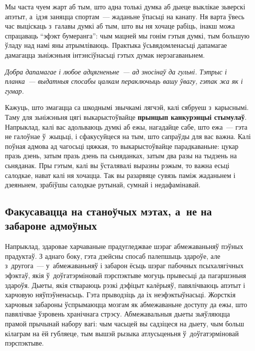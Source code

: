 
Мы часта чуем жарт аб тым, што адна толькі думка аб дыеце выклікае зьверскі апэтыт, а~ідэя заняцца спортам~--- жаданьне ўпасьці на канапу. Ня варта ўвесь час выціскаць з~галавы думкі аб тым, што вы ня хочаце рабіць, інакш можа спрацаваць ``эфэкт бумеранга'': чым мацней мы гонім гэтыя думкі, тым большую ўладу над намі яны атрымліваюць. Практыка ўсьвядомленасьці дапамагае дамагацца зьніжэньня інтэнсіўнасьці гэтых думак нерэагаваньнем.

\emph{Добра дапамагае і любое адцягненьне~--- ад зносінаў да гульні. Тэтрыс і планка~--- выдатныя спосабы цалкам пераключыць вашу ўвагу, гэтак жа як і гумар.}

Кажуць, што змагацца са шкоднымі звычкамі лягчэй, калі сябруеш з~карыснымі. Таму для зьніжэньня цягі выкарыстоўвайце \textbf{прынцып канкурэнцыі стымулаў}. Напрыклад, калі вас адольваюць думкі аб ежы, нагадайце сабе, што ежа~--- гэта не галоўнае ў~жыцьці, і сфакусуйцеся на тым, што сапраўды для вас важна. Калі поўная адмова ад чагосьці цяжкая, то выкарыстоўвайце парадкаваньне: цукар празь дзень, затым празь дзень па сьняданках, затым два разы на тыдзень на сьняданак. Пры гэтым, калі вы ўсталявалі выразны рэжым, то важна есьці салодкае, нават калі ня хочацца. Так вы разарвяце сувязь паміж жаданьнем і дзеяньнем, зрабіўшы салодкае рутынай, сумнай і недафамінавай.

\subsection*{Факусавацца на станоўчых мэтах, а~не на забароне адмоўных}

Напрыклад, здаровае харчаваньне прадугледжвае шэраг абмежаваньняў пэўных прадуктаў. З аднаго боку, гэта дзейсны спосаб палепшыць здароўе, але з~другога~--- у~абмежаваньняў і забарон ёсьць шэраг пабочных псыхалягічных эфэктаў, якія ў~доўгатэрміновай пэрспэктыве могуць прывесьці да пагаршэньня здароўя. Дыеты, якія ствараюць рэзкі дэфіцыт калёрыяў, павялічваюць апэтыт і харчовую няўпэўненасьць. Гэта прыводзіць да іх неэфэктыўнасьці. Жорсткія харчовыя забароны ўспрымаюцца мозгам як абмежаваньне доступу да ежы, што павялічвае ўзровень хранічнага стрэсу. Абмежавальныя дыеты зьяўляюцца прамой прычынай набору вагі: чым часьцей вы садзіцеся на дыету, чым больш кілаграм на ёй губляеце, тым вышэй рызыка атлусьценьня ў~доўгатэрміновай пэрспэктыве.

